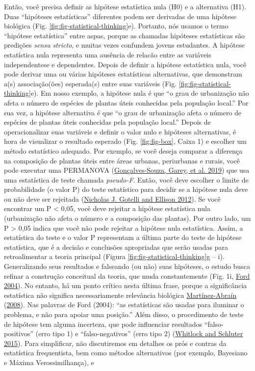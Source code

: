 \documentclass[
]{article}
\begin{document}
Então, você precisa definir as hipótese estatística nula (H0) e a alternativa (H1). Duas ``hipóteses estatísticas'' diferentes podem ser derivadas de uma hipótese biológica (Fig. \ref{fig:fig-statistical-thinking}e). Portanto, nós usamos o termo ``hipótese estatística'' entre aspas, porque as chamadas hipóteses estatísticas são predições \emph{sensu stricto}, e muitas vezes confundem jovens estudantes. A hipótese estatística nula representa uma ausência de relacão entre as variáveis independentese e dependentes. Depois de definir a hipótese estatística nula, você pode derivar uma ou várias hipóteses estatísticas alternativas, que demonstram a(s) associação(ões) esperada(s) entre suas variáveis (Fig. \ref{fig:fig-statistical-thinking}e). Em nosso exemplo, a hipótese nula é que ``o grau de urbanização não afeta o número de espécies de plantas úteis conhecidas pela população local.'' Por sua vez, a hipótese alternativa é que ``o grau de urbanização afeta o número de espécies de plantas úteis conhecidas pela população local.'' Depois de operacionalizar suas variáveis e definir o valor nulo e hipóteses alternativas, é hora de visualizar o resultado esperado (Fig. \ref{fig:fig-box}, Caixa 1) e escolher um método estatístico adequado. Por exemplo, se você deseja comparar a diferença na composição de plantas úteis entre áreas urbanas, periurbanas e rurais, você pode executar uma PERMANOVA (\protect\hyperlink{ref-albuquerque_multidimensional_2019}{Gonçalves-Souza, Garey, et al. 2019}) que usa uma estatística de teste chamada \emph{pseudo-F}. Então, você deve escolher o limite de probabilidade (o valor P) do teste estatístico para decidir se a hipótese nula deve ou não deve ser rejeitada (\protect\hyperlink{ref-gotelli_primer_2012}{Nicholas J. Gotelli and Ellison 2012}). Se você encontrar um P \textless{} 0,05, você deve rejeitar a hipótese estatística nula (urbanização não afeta o número e a composição das plantas). Por outro lado, um P \textgreater{} 0,05 indica que você não pode rejeitar a hipótese nula estatística. Assim, a estatística do teste e o valor P representam a última parte do teste de hipótese estatística, que é a decisão e conclusões apropriadas que serão usadas para retroalimentar a teoria principal (Figura \ref{fig:fig-statistical-thinking}g -- i). Generalizando seus resultados e falseando (ou não) suas hipóteses, o estudo busca refinar a construção conceitual da teoria, que muda constantemente (Fig. 1i, \protect\hyperlink{ref-ford_scientific_2004}{Ford 2004}). No entanto, há um ponto crítico nesta última frase, porque a significância estatística não significa necessariamente relevância biológica \protect\hyperlink{ref-martinez-abrain_statistical_2008}{Martínez-Abraín} (\protect\hyperlink{ref-martinez-abrain_statistical_2008}{2008}). Nas palavras de Ford (2004): ``as estatísticas são usadas para iluminar o problema, e não para apoiar uma posição.'' Além disso, o procedimento de teste de hipótese tem alguma incerteza, que pode influenciar resultados ``falso-positivos'' (erro tipo 1) e ``falso-negativos'' (erro tipo 2) (\protect\hyperlink{ref-whitlock_analysis_2015}{Whitlock and Schluter 2015}). Para simplificar, não discutiremos em detalhes os prós e contras da estatística frequentista, bem como métodos alternativos (por exemplo, Bayesiano e Máxima Verossimilhança), e 
\end{document}
